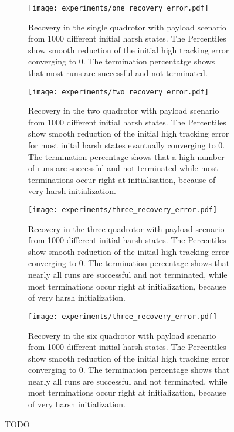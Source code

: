 \begin{figure}[]
    \centering
    \begin{subfigure}[b]{0.49\textwidth}
        \centering
        
        \texttt{[image: experiments/one\_recovery\_error.pdf]}
        \caption{Recovery in the single quadrotor with payload scenario from 1000 different initial harsh states. The Percentiles show smooth reduction of the initial high tracking error converging to 0. The termination percentatge shows that most runs are successful and not terminated.}
        \label{fig:payload_error_over_time_single}
    \end{subfigure}
    \hfill
     \begin{subfigure}[b]{0.49\textwidth}
        \centering
        
        \texttt{[image: experiments/two\_recovery\_error.pdf]}
        \caption{Recovery in the two quadrotor with payload scenario from 1000 different initial harsh states. The Percentiles show smooth reduction of the initial high tracking error for most inital harsh states evantually converging to 0. The termination percentage shows that a high number of runs are successful and not terminated while most terminations occur right at initialization, because of very harsh initialization.}
        \label{fig:payload_error_over_time_two}
    \end{subfigure}
    \begin{subfigure}[b]{0.49\textwidth}
        \centering
        
        \texttt{[image: experiments/three\_recovery\_error.pdf]}
        \caption{Recovery in the three quadrotor with payload scenario from 1000 different initial harsh states. The Percentiles show smooth reduction of the initial high tracking error converging to 0. The termination percentage shows that nearly all runs are successful and not terminated, while most terminations occur right at initialization, because of very harsh initialization.}
        \label{fig:payload_error_over_time_three}
    \end{subfigure}
    \begin{subfigure}[b]{0.49\textwidth}
        \centering
        
        \texttt{[image: experiments/three\_recovery\_error.pdf]}
        \caption{Recovery in the six quadrotor with payload scenario from 1000 different initial harsh states. The Percentiles show smooth reduction of the initial high tracking error converging to 0. The termination percentage shows that nearly all runs are successful and not terminated, while most terminations occur right at initialization, because of very harsh initialization.}
        \label{fig:payload_error_over_time_six}
    \end{subfigure}


    \caption{TODO}
    \label{fig:single_quad_payload_subfigs}
\end{figure}



